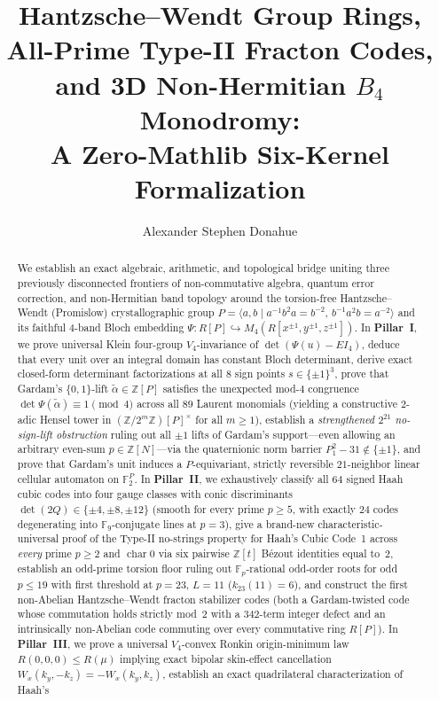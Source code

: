\documentclass[11pt,reqno]{amsart}
\title[Hantzsche--Wendt Group Rings, All-Prime Fractons, and $B_4$ Amoebae]{%
Hantzsche--Wendt Group Rings,\\
All-Prime Type-II Fracton Codes, and 3D Non-Hermitian $B_4$ Monodromy:\\
A Zero-Mathlib Six-Kernel Formalization}
\author{Alexander Stephen Donahue}
\theoremstyle{definition}
\newcommand{\Z}{\mathbb{Z}}
\newcommand{\F}{\mathbb{F}}
\begin{document}
\begin{abstract}
We establish an exact algebraic, arithmetic, and topological bridge uniting three previously
disconnected frontiers of non-commutative algebra, quantum error correction, and non-Hermitian
band topology around the torsion-free Hantzsche--Wendt (Promislow) crystallographic group
$P = \langle a,b \mid a^{-1}b^2a = b^{-2},\, b^{-1}a^2b = a^{-2}\rangle$ and its faithful
$4$-band Bloch embedding $\Psi : R[P] \hookrightarrow M_4(R[x^{\pm 1}, y^{\pm 1}, z^{\pm 1}])$.
In \textbf{Pillar~I}, we prove universal Klein four-group $V_4$-invariance of
$\det(\Psi(u)-EI_4)$, deduce that every unit over an integral domain has constant Bloch
determinant, derive exact closed-form determinant factorizations at all $8$ sign points
$s \in \{\pm 1\}^3$, prove that Gardam's $\{0,1\}$-lift $\widetilde{\alpha} \in \Z[P]$ satisfies
the unexpected mod-$4$ congruence $\det\Psi(\widetilde{\alpha}) \equiv 1 \pmod{4}$ across all
$89$ Laurent monomials (yielding a constructive $2$-adic Hensel tower in $(\Z/2^m\Z)[P]^\times$
for all $m \ge 1$), establish a \emph{strengthened $2^{21}$ no-sign-lift obstruction} ruling out
all $\pm 1$ lifts of Gardam's support---even allowing an arbitrary even-sum $p \in \Z[N]$---via
the quaternionic norm barrier $P_1^2 - 31 \notin \{\pm 1\}$, and prove that Gardam's unit induces
a $P$-equivariant, strictly reversible $21$-neighbor linear cellular automaton on $\F_2^P$.
In \textbf{Pillar~II}, we exhaustively classify all $64$ signed Haah cubic codes into four gauge
classes with conic discriminants $\det(2Q) \in \{\pm 4, \pm 8, \pm 12\}$ (smooth for every prime
$p \ge 5$, with exactly $24$ codes degenerating into $\F_9$-conjugate lines at $p=3$), give a
brand-new characteristic-universal proof of the Type-II no-strings property for Haah's Cubic Code~1
across \emph{every} prime $p \ge 2$ and $\operatorname{char} 0$ via six pairwise $\Z[t]$ B\'ezout
identities equal to~$2$, establish an odd-prime torsion floor ruling out $\F_p$-rational odd-order
roots for odd $p \le 19$ with first threshold at $p=23$, $L=11$ ($k_{23}(11)=6$), and construct
the first non-Abelian Hantzsche--Wendt fracton stabilizer codes (both a Gardam-twisted code whose
commutation holds strictly mod~$2$ with a $342$-term integer defect and an intrinsically
non-Abelian code commuting over every commutative ring $R[P]$).
In \textbf{Pillar~III}, we prove a universal $V_4$-convex Ronkin origin-minimum law
$R(0,0,0) \le R(\mu)$ implying exact bipolar skin-effect cancellation
$W_x(k_y,-k_z) = -W_x(k_y,k_z)$, establish an exact quadrilateral characterization of Haah's

\end{abstract}
\end{document}
